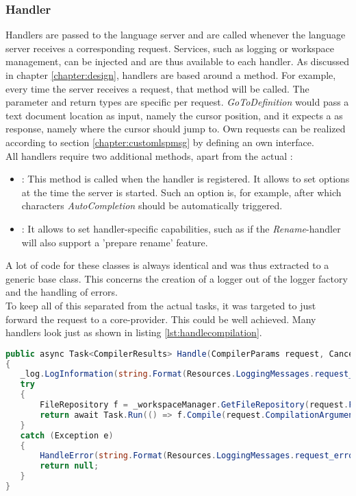 \subsubsection{Handler}
Handlers are passed to the language server and are called whenever the language server receives a corresponding request.
Services, such as logging or workspace management, can be injected and are thus available to each handler.
As discussed in chapter \ref{chapter:design}, handlers are based around a  method.
For example, every time the server receives a  request, that  method will be called.
The parameter and return types are specific per request.
\textit{GoToDefinition} would pass a text document location as input, namely the cursor position, and it expects a  as response,
namely where the cursor should jump to.
Own requests can be realized according to section \ref{chapter:customlspmsg} by defining an own interface.\\

All handlers require two additional methods, apart from the actual :
\begin{itemize}
    \item {}: This method is called when the handler is registered.
    It allows to set options at the time the server is started.
    Such an option is, for example, after which characters \textit{AutoCompletion} should be automatically triggered.
    \item {}: It allows to set handler-specific capabilities, such as if the \textit{Rename}-handler will also support a 'prepare rename' feature.
\end{itemize}

A lot of code for these classes is always identical and was thus extracted to a generic base class.
This concerns the creation of a logger out of the logger factory and the handling of errors.\\

To keep all of this separated from the actual tasks, it was targeted to just forward the request to a core-provider.
This could be well achieved.
Many handlers look just as shown in listing \ref{lst:handlecompilation}.

\begin{lstlisting}[language=csharp, caption={Handling Compilation}, captionpos=b, label={lst:handlecompilation}]
public async Task<CompilerResults> Handle(CompilerParams request, CancellationToken cancellationToken)
{
   _log.LogInformation(string.Format(Resources.LoggingMessages.request_handle, _method));
   try
   {
       FileRepository f = _workspaceManager.GetFileRepository(request.FileToCompile);
       return await Task.Run(() => f.Compile(request.CompilationArguments), cancellationToken);
   }
   catch (Exception e)
   {
       HandleError(string.Format(Resources.LoggingMessages.request_error, _method), e);
       return null;
   }
}
\end{lstlisting}

